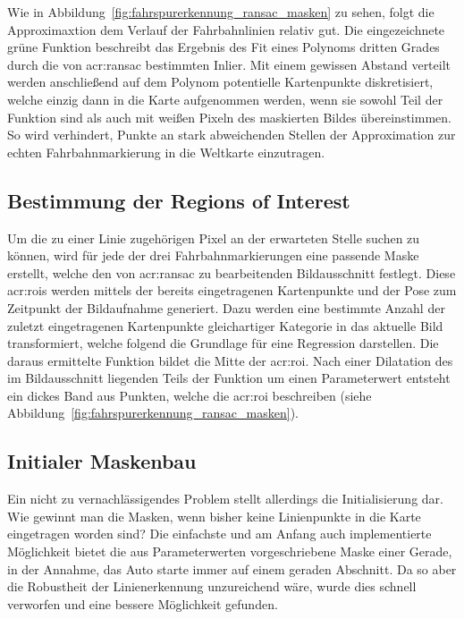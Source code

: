 Wie in Abbildung~\ref{fig:fahrspurerkennung_ransac_masken} zu sehen, folgt die Approximaxtion dem Verlauf der Fahrbahnlinien relativ gut. Die eingezeichnete grüne Funktion beschreibt das Ergebnis des Fit eines Polynoms dritten Grades durch die von \gls{acr:ransac} bestimmten Inlier. Mit einem gewissen Abstand verteilt werden anschließend auf dem Polynom potentielle Kartenpunkte diskretisiert, welche einzig dann in die Karte aufgenommen werden, wenn sie sowohl Teil der Funktion sind als auch mit weißen Pixeln des maskierten Bildes übereinstimmen. So wird verhindert, Punkte an stark abweichenden Stellen der Approximation zur echten Fahrbahnmarkierung in die Weltkarte einzutragen. 


\subsection{Bestimmung der \glqq Regions of Interest\grqq{}}

Um die zu einer Linie zugehörigen Pixel an der erwarteten Stelle suchen zu können, wird für jede der drei Fahrbahnmarkierungen eine passende Maske erstellt, welche den von \gls{acr:ransac} zu bearbeitenden Bildausschnitt festlegt. Diese \glspl{acr:roi} werden mittels der bereits eingetragenen Kartenpunkte und der Pose zum Zeitpunkt der Bildaufnahme generiert.  
Dazu werden eine bestimmte Anzahl der zuletzt eingetragenen Kartenpunkte gleichartiger Kategorie in das aktuelle Bild transformiert, welche folgend die Grundlage für eine Regression darstellen. Die daraus ermittelte Funktion bildet die Mitte der \gls{acr:roi}. Nach einer Dilatation des im Bildausschnitt liegenden Teils der Funktion um einen Parameterwert entsteht ein dickes Band aus Punkten, welche die \gls{acr:roi} beschreiben (siehe Abbildung~\ref{fig:fahrspurerkennung_ransac_masken}).

\subsection{Initialer Maskenbau} 
\label{par:maskenbau:initial}

Ein nicht zu vernachlässigendes Problem stellt allerdings die Initialisierung dar. Wie gewinnt man die Masken, wenn bisher keine Linienpunkte in die Karte eingetragen worden sind? Die einfachste und am Anfang auch implementierte Möglichkeit bietet die aus Parameterwerten vorgeschriebene Maske einer Gerade, in der Annahme, das Auto starte immer auf einem geraden Abschnitt. Da so aber die Robustheit der Linienerkennung unzureichend wäre, wurde dies schnell verworfen und eine bessere Möglichkeit gefunden. 

